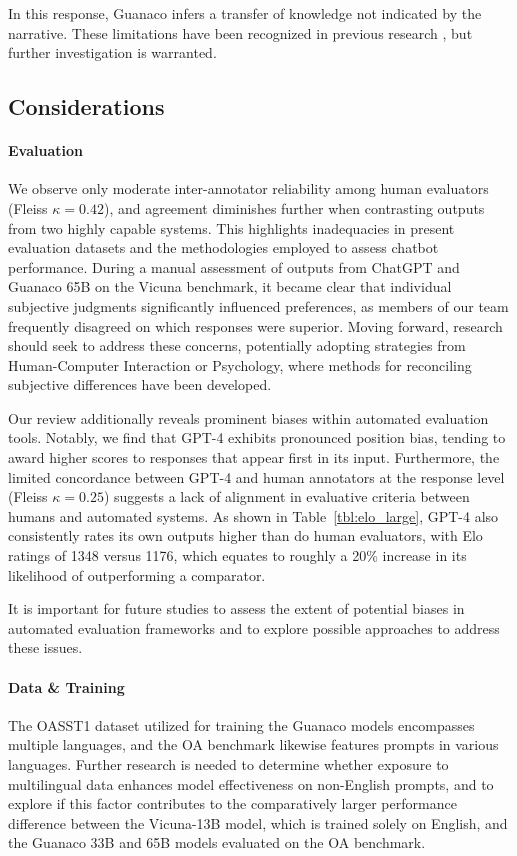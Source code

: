 In this response, {Guanaco} infers a transfer of knowledge not indicated by the narrative. These limitations have been recognized in previous research \cite{sap2022neural}, but further investigation is warranted.

\subsection{Considerations}
\label{ssec:considerations}

\paragraph{Evaluation}

We observe only moderate inter-annotator reliability among human evaluators (Fleiss $\kappa=0.42$), and agreement diminishes further when contrasting outputs from two highly capable systems. This highlights inadequacies in present evaluation datasets and the methodologies employed to assess chatbot performance. During a manual assessment of outputs from ChatGPT and {Guanaco} 65B on the Vicuna benchmark, it became clear that individual subjective judgments significantly influenced preferences, as members of our team frequently disagreed on which responses were superior. Moving forward, research should seek to address these concerns, potentially adopting strategies from Human-Computer Interaction or Psychology, where methods for reconciling subjective differences have been developed.

Our review additionally reveals prominent biases within automated evaluation tools. Notably, we find that GPT-4 exhibits pronounced position bias, tending to award higher scores to responses that appear first in its input. Furthermore, the limited concordance between GPT-4 and human annotators at the response level (Fleiss $\kappa=0.25$) suggests a lack of alignment in evaluative criteria between humans and automated systems. As shown in Table~\ref{tbl:elo_large}, GPT-4 also consistently rates its own outputs higher than do human evaluators, with Elo ratings of 1348 versus 1176, which equates to roughly a 20\% increase in its likelihood of outperforming a comparator.

It is important for future studies to assess the extent of potential biases in automated evaluation frameworks and to explore possible approaches to address these issues.

\paragraph{Data \& Training} The OASST1 dataset utilized for training the {Guanaco} models encompasses multiple languages, and the OA benchmark likewise features prompts in various languages. Further research is needed to determine whether exposure to multilingual data enhances model effectiveness on non-English prompts, and to explore if this factor contributes to the comparatively larger performance difference between the Vicuna-13B model, which is trained solely on English, and the {Guanaco} 33B and 65B models evaluated on the OA benchmark.

